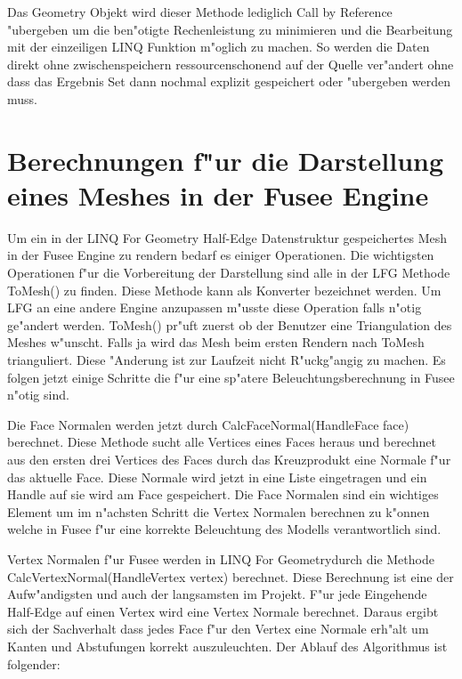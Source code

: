 \documentclass[pagesize, paper=a4, fontsize=12pt,titlepage=true, headings=small, headnosepline, abstractoff, liststotoc, nochapterprefix, plainheadsepline]{scrreprt}
\newcommand{\LFG}{LINQ For Geometry}
\newcommand{\LFGS}{LINQ For Geometry }
\newcommand{\HES}{Half-Edge Datenstruktur }
\begin{document}
Das Geometry Objekt wird dieser Methode lediglich Call by Reference "ubergeben um die ben"otigte Rechenleistung zu minimieren und die Bearbeitung mit der einzeiligen LINQ Funktion m"oglich zu machen. So werden die Daten direkt ohne zwischenspeichern ressourcenschonend auf der Quelle ver"andert ohne dass das Ergebnis Set dann nochmal explizit gespeichert oder "ubergeben werden muss.
\newpage
	\section {Berechnungen f"ur die Darstellung eines Meshes in der Fusee Engine}
	Um ein in der \LFGS \HES gespeichertes Mesh in der Fusee Engine zu rendern bedarf es einiger Operationen. Die wichtigsten Operationen f"ur die Vorbereitung der Darstellung sind alle in der LFG Methode ToMesh() zu finden. Diese Methode kann als Konverter bezeichnet werden. Um LFG an eine andere Engine anzupassen m"usste diese Operation falls n"otig ge"andert werden. ToMesh() pr"uft zuerst ob der Benutzer eine Triangulation des Meshes w"unscht. Falls ja wird das Mesh beim ersten Rendern nach ToMesh trianguliert. Diese "Anderung ist zur Laufzeit nicht R"uckg"angig zu machen. Es folgen jetzt einige Schritte die f"ur eine sp"atere Beleuchtungsberechnung in Fusee n"otig sind.

Die Face Normalen werden jetzt durch CalcFaceNormal(HandleFace face) berechnet. Diese Methode sucht alle Vertices eines Faces heraus und berechnet aus den ersten drei Vertices des Faces durch das Kreuzprodukt eine Normale f"ur das aktuelle Face. Diese Normale wird jetzt in eine Liste eingetragen und ein Handle auf sie wird am Face gespeichert. Die Face Normalen sind ein wichtiges Element um im n"achsten Schritt die Vertex Normalen berechnen zu k"onnen welche in Fusee f"ur eine korrekte Beleuchtung des Modells verantwortlich sind.

Vertex Normalen f"ur Fusee werden in \LFG durch die Methode CalcVertexNormal(HandleVertex vertex) berechnet. Diese Berechnung ist eine der Aufw"andigsten und auch der langsamsten im Projekt. F"ur jede Eingehende Half-Edge auf einen Vertex wird eine Vertex Normale berechnet. Daraus ergibt sich der Sachverhalt dass jedes Face f"ur den Vertex eine Normale erh"alt um Kanten und Abstufungen korrekt auszuleuchten. Der Ablauf des Algorithmus ist folgender:
\end{document}
